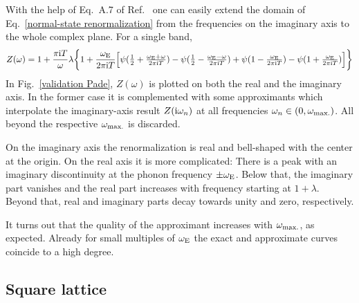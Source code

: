 With the help of Eq.~A.7 of Ref.~ one can easily
extend the domain of Eq.~\ref{normal-state renormalization} from the
 frequencies on the imaginary axis to the whole complex plane.
For a single band,
%
\begin{equation*}
    Z(\omega) = 1 + \frac {\pi \mathrm i T} \omega \lambda \bigg \{
        1 + \frac{\omega \sb{\text{E}}}{2 \pi \mathrm i T} \Big[
              \psi(\tfrac 1 2 + \tfrac{\omega \sb{\text{E}} + \omega}{2 \pi \mathrm i T})
            - \psi(\tfrac 1 2 - \tfrac{\omega \sb{\text{E}} - \omega}{2 \pi \mathrm i T})
            + \psi(1 - \tfrac{\omega \sb{\text{E}}}{2 \pi \mathrm i T})
            - \psi(1 + \tfrac{\omega \sb{\text{E}}}{2 \pi \mathrm i T})
        \Big]
    \bigg \}
\end{equation*}
%
In Fig.~\ref{validation Pade}, $Z(\omega)$ is plotted on both the real and the
imaginary axis. In the former case it is complemented with some 
approximants which interpolate the imaginary-axis result $Z(\mathrm i \omega_n)$ at all
 frequencies $\omega_n \in (0, \omega \sb{\text{max.}})$. All beyond
the respective $\omega \sb{\text{max.}}$ is discarded.

On the imaginary axis the renormalization is real and bell-shaped with the
center at the origin. On the real axis it is more complicated: There is a peak
with an imaginary discontinuity at the phonon frequency $\pm \omega \sb{\text{E}}$.
Below that, the imaginary part vanishes and the real part increases with
frequency starting at $1 + \lambda$. Beyond that, real and imaginary parts decay
towards unity and zero, respectively.

It turns out that the quality of the  approximant increases with
$\omega \sb{\text{max.}}$, as expected. Already for small multiples of $\omega \sb{\text{E}}$
the exact and approximate curves coincide to a high degree.

\subsection{Square lattice}
\label{square lattice}


